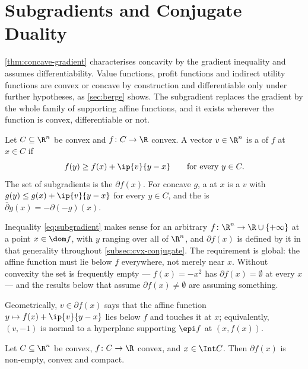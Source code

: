 \section{Subgradients and Conjugate Duality}\label{sec:cvx-subgradient}

\autoref{thm:concave-gradient} characterises concavity by the gradient inequality
and assumes differentiability. Value functions, profit functions and indirect
utility functions are convex or concave by construction and differentiable only
under further hypotheses, as \autoref{sec:berge} shows. The subgradient
replaces the gradient by the whole family of supporting affine functions, and it
exists wherever the function is convex, differentiable or not.

\begin{definition}\label{def:subgradient}
	Let $C\subseteq\R^n$ be convex and $f\colon C\to\R$ convex. A vector
	$v\in\R^n$ is a  of $f$ at $x\in C$ if
	\begin{equation}\label{eq:subgradient}
		f(y)\geq f(x)+\ip{v}{y-x}\qquad\text{for every }y\in C .
	\end{equation}
	The set of subgradients is the 
	$\partial f(x)$. For concave $g$, a  at $x$
	is a $v$ with $g(y)\leq g(x)+\ip{v}{y-x}$ for every $y\in C$, and the
	 is
	$\bar\partial g(x)=-\partial(-g)(x)$.
\end{definition}

Inequality \eqref{eq:subgradient} makes sense for an arbitrary
$f\colon\R^n\to\R\cup\{+\infty\}$ at a point $x\in\dom f$, with $y$ ranging over
all of $\R^n$, and $\partial f(x)$ is defined by it in that generality
throughout \autoref{subsec:cvx-conjugate}. The requirement is global: the affine
function must lie below $f$ everywhere, not merely near $x$. Without convexity
the set is frequently empty --- $f(x)=-x^{2}$ has $\partial f(x)=\emptyset$ at
every $x$ --- and the results below that assume $\partial f(x)\neq\emptyset$ are
assuming something.

Geometrically, $v\in\partial f(x)$ says that the affine function
$y\mapsto f(x)+\ip{v}{y-x}$ lies below $f$ and touches it at $x$; equivalently,
$(v,-1)$ is normal to a hyperplane supporting $\epi f$ at $(x,f(x))$.

\begin{theorem}\label{thm:subgradient-exists}
	Let $C\subseteq\R^n$ be convex, $f\colon C\to\R$ convex, and $x\in\Int C$. Then
	$\partial f(x)$ is non-empty, convex and compact.
\end{theorem}

